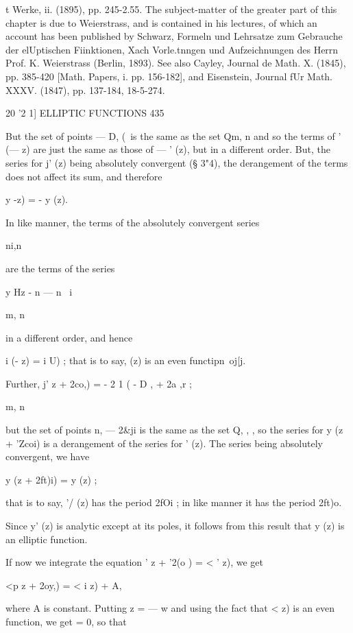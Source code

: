 {t Werke, ii. (1895), pp. 245-2.55. The subject-matter of the greater part of this chapter is 
due to Weierstrass, and is contained in his lectures, of which an account has been published by 
Schwarz, Formeln und Lehrsatze zum Gebrauche der elUptischen Fiinktionen, Xach Vorle.tnngen 
und Aufzeichnungen des Herrn Prof. K. Weierstrass (Berlin, 1893). See also Cayley, Journal de 
Math. X. (1845), pp. 385-420 [Math. Papers, i. pp. 156-182], and Eisenstein, Journal fUr Math. 
XXXV. (1847), pp. 137-184, 18-5-274. 



20 '2 1] ELLIPTIC FUNCTIONS 435 

But the set of points — D, (\    is the same as the set Qm, n and so the 
terms of  ' (— z) are just the same as those of —  ' (z), but in a different 
order. But, the series for  j' (z) being absolutely convergent (§ 3"4), the 
derangement of the terms does not affect its sum, and therefore 

 y  -z) = -  y (z). 

In like manner, the terms of the absolutely convergent series 

ni,n 

are the terms of the series 

y Hz - n    — n~  i 



m, n 



in a different order, and hence 

i  (- z) = i  U) ; 
that is to say,   (z) is an even functipn\ oj[j. 

Further,  j'  z + 2co,) = - 2 1 (  - D ,  + 2a ,r  ; 

m, n 

but the set of points n,     — 2\&ji is the same as the set Q, ,  , so the series 
for  y (z + 'Zcoi) is a derangement of the series for  ' (z). The series being 
absolutely convergent, we have 

 y (z + 2ft)i) =  y (z) ; 

that is to say, '/ (z) has the period 2fOi ; in like manner it has the period 2ft)o. 

Since  y' (z) is analytic except at its poles, it follows from this result that 
 y (z) is an elliptic function. 

If now we integrate the equation  '  z + '2(o ) = < '  z), we get 

<p z + 2oy,) = < i z) + A, 

where A is constant. Putting z = — w  and using the fact that <   z) is an 
even function, we get   = 0, so that 

}
